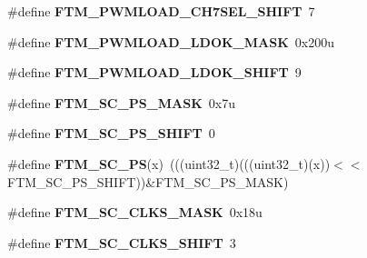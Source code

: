 \begin{DoxyCompactItemize}
\item 
\#define {\bfseries F\+T\+M\+\_\+\+P\+W\+M\+L\+O\+A\+D\+\_\+\+C\+H7\+S\+E\+L\+\_\+\+S\+H\+I\+FT}~7\hypertarget{group__FTM__Register__Masks_ga05ca23b88e7443efc46331367ccb6484}{}\label{group__FTM__Register__Masks_ga05ca23b88e7443efc46331367ccb6484}

\item 
\#define {\bfseries F\+T\+M\+\_\+\+P\+W\+M\+L\+O\+A\+D\+\_\+\+L\+D\+O\+K\+\_\+\+M\+A\+SK}~0x200u\hypertarget{group__FTM__Register__Masks_ga3e984a537814ee8e4130be4e822671d4}{}\label{group__FTM__Register__Masks_ga3e984a537814ee8e4130be4e822671d4}

\item 
\#define {\bfseries F\+T\+M\+\_\+\+P\+W\+M\+L\+O\+A\+D\+\_\+\+L\+D\+O\+K\+\_\+\+S\+H\+I\+FT}~9\hypertarget{group__FTM__Register__Masks_ga17e018e9c7812e93d45434bd8db18634}{}\label{group__FTM__Register__Masks_ga17e018e9c7812e93d45434bd8db18634}

\item 
\#define {\bfseries F\+T\+M\+\_\+\+S\+C\+\_\+\+P\+S\+\_\+\+M\+A\+SK}~0x7u\hypertarget{group__FTM__Register__Masks_ga6d12f2131f28899f9d18b8e7fe12349f}{}\label{group__FTM__Register__Masks_ga6d12f2131f28899f9d18b8e7fe12349f}

\item 
\#define {\bfseries F\+T\+M\+\_\+\+S\+C\+\_\+\+P\+S\+\_\+\+S\+H\+I\+FT}~0\hypertarget{group__FTM__Register__Masks_ga8c61fdf29e7bfcc3b61c9b3cc86019b6}{}\label{group__FTM__Register__Masks_ga8c61fdf29e7bfcc3b61c9b3cc86019b6}

\item 
\#define {\bfseries F\+T\+M\+\_\+\+S\+C\+\_\+\+PS}(x)~(((uint32\+\_\+t)(((uint32\+\_\+t)(x))$<$$<$F\+T\+M\+\_\+\+S\+C\+\_\+\+P\+S\+\_\+\+S\+H\+I\+FT))\&F\+T\+M\+\_\+\+S\+C\+\_\+\+P\+S\+\_\+\+M\+A\+SK)\hypertarget{group__FTM__Register__Masks_ga065038b692ab15f728ec344376d66c5b}{}\label{group__FTM__Register__Masks_ga065038b692ab15f728ec344376d66c5b}

\item 
\#define {\bfseries F\+T\+M\+\_\+\+S\+C\+\_\+\+C\+L\+K\+S\+\_\+\+M\+A\+SK}~0x18u\hypertarget{group__FTM__Register__Masks_ga4a0ff5e0b4f7181e51e0139abfa6d7d3}{}\label{group__FTM__Register__Masks_ga4a0ff5e0b4f7181e51e0139abfa6d7d3}

\item 
\#define {\bfseries F\+T\+M\+\_\+\+S\+C\+\_\+\+C\+L\+K\+S\+\_\+\+S\+H\+I\+FT}~3\hypertarget{group__FTM__Register__Masks_ga9c8973dcfd297dfda1f057c14e1deb4b}{}\label{group__FTM__Register__Masks_ga9c8973dcfd297dfda1f057c14e1deb4b}


\end{DoxyCompactItemize}
